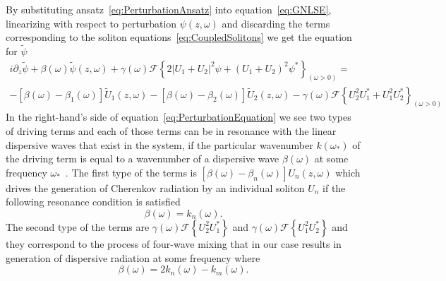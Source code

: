 \documentclass[aps, prl, twocolumn, superscriptaddress, final]{revtex4}
\newcommand{\abs}[1]{\left| #1 \right|}
\begin{document}
\begin{widetext}
By substituting ansatz~\eqref{eq:PerturbationAnsatz} into equation~\eqref{eq:GNLSE}, linearizing with respect to perturbation $\psi(z, \omega)$ and discarding the terms corresponding to the soliton equations~\eqref{eq:CoupledSolitons} we get the equation for $\tilde \psi$
\begin{multline}
  \label{eq:PerturbationEquation}
  i \partial_{z} \tilde \psi
    + \beta(\omega) \tilde \psi(z, \omega)
    + \gamma(\omega) \mathcal{F}\left\{
      2 \abs{U_{1} + U_{2}}^{2} \psi +
      \left( U_{1} + U_{2} \right)^{2} \psi^{*}
    \right\}_{(\omega > 0)} = \\
    - \left[ \beta(\omega) - \beta_{1}(\omega) \right] \tilde U_{1}(z, \omega)
    - \left[ \beta(\omega) - \beta_{2}(\omega) \right] \tilde U_{2}(z, \omega)
    - \gamma(\omega) \mathcal{F} \left\{
      U_{2}^{2} U_{1}^{*} + U_{1}^{2} U_{2}^{*}
    \right\}_{(\omega > 0)}
\end{multline}
In the right-hand's side of equation~\eqref{eq:PerturbationEquation} we see two types of driving terms and each of those terms can be in resonance with the linear dispersive waves that exist in the system, if the particular wavenumber $k(\omega_{*})$ of the driving term is equal to a wavenumber of a dispersive wave $\beta(\omega)$ at some frequency $\omega_{*}$~\cite{akhmediev1995cherenkov, yulin2004four}. The first type of the terms is $\left[ \beta(\omega) - \beta_{n}(\omega) \right] U_{n}(z, \omega)$ which drives the generation of Cherenkov radiation by an individual soliton $U_{n}$ if the following resonance condition is satisfied
\begin{equation}
  \label{eq:CherenkovRadiationResonanceCondition}
  \beta(\omega) = k_{n}(\omega).
\end{equation}
The second type of the terms are $\gamma(\omega) \mathcal{F}\left\{ U_{2}^{2} U_{1}^{*} \right\}$ and $\gamma(\omega) \mathcal{F}\left\{ U_{1}^{2} U_{2}^{*} \right\}$ and they correspond to the process of four-wave mixing that in our case results in generation of dispersive radiation at some frequency where
\begin{equation}
  \label{eq:FWMRadiationResonanceCondition}
  \beta(\omega) = 2 k_{n}(\omega)  - k_{m}(\omega).
\end{equation}


\end{widetext}
\end{document}
